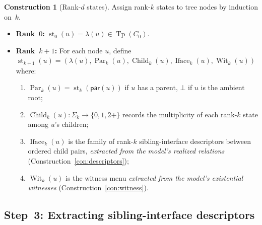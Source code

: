 \documentclass[11pt]{article}
\theoremstyle{definition}
\newtheorem{construction}[theorem]{Construction}
\theoremstyle{remark}
\newcommand{\Tp}{\operatorname{Tp}}
\newcommand{\st}{\operatorname{st}}
\newcommand{\Wit}{\operatorname{Wit}}
\newcommand{\Iface}{\operatorname{Iface}}
\newcommand{\Child}{\operatorname{Child}}
\newcommand{\Par}{\operatorname{Par}}
\begin{document}
\begin{construction}[Rank-$d$ states]\label{con:states}
Assign rank-$k$ states to tree nodes by induction on~$k$.
\begin{itemize}
\item \textbf{Rank~$0$:}\; $\st_0(u)=\lambda(u)\in\Tp(C_0)$.
\item \textbf{Rank~$k{+}1$:}\; For each node $u$, define
  $\st_{k+1}(u)=(\lambda(u),\Par_k(u),\Child_k(u),\Iface_k(u),\Wit_k(u))$
  where:
  \begin{enumerate}[label=(\alph*)]
  \item $\Par_k(u)=\st_k(\mathsf{par}(u))$ if $u$ has a parent,
    $\bot$ if $u$ is the ambient root;
  \item $\Child_k(u):\Sigma_k\to\{0,1,2{+}\}$ records the multiplicity
    of each rank-$k$ state among $u$'s children;
  \item $\Iface_k(u)$ is the family of rank-$k$ sibling-interface
    descriptors between ordered child pairs, \emph{extracted from the
    model's realized relations} (Construction~\ref{con:descriptors});
  \item $\Wit_k(u)$ is the witness menu \emph{extracted from the
    model's existential witnesses} (Construction~\ref{con:witness}).
  \end{enumerate}
\end{itemize}
\end{construction}

\subsection{Step~3: Extracting sibling-interface descriptors}
\end{document}
